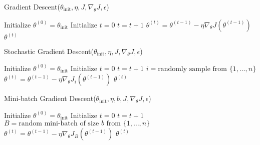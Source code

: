 \documentclass{article}
\begin{document}
\begin{algorithm*}
\caption{Gradient Descent($\theta_{\text{init}}, \eta, J, \nabla_\theta J, \epsilon$)}
\label{alg:gradient-descent}
\begin{algorithmic}[1]
\STATE Initialize $\theta^{(0)} = \theta_{\text{init}}$
\STATE Initialize $t = 0$
\REPEAT
  \STATE $t = t + 1$
  \STATE $\theta^{(t)} = \theta^{(t-1)} - \eta \nabla_\theta J(\theta^{(t-1)})$
\RETURN $\theta^{(t)}$
\end{algorithmic}
\end{algorithm*}

\clearpage

\begin{algorithm*}
\caption{Stochastic Gradient Descent($\theta_{\text{init}}, \eta, J, \nabla_\theta J, \epsilon$)}
\label{alg:stochastic-gradient-descent}
\begin{algorithmic}[1]
\STATE Initialize $\theta^{(0)} = \theta_{\text{init}}$
\STATE Initialize $t = 0$
\REPEAT
  \STATE $t = t + 1$
  \STATE $i = \text{randomly sample from } \{1, \ldots, n\}$
  \STATE $\theta^{(t)} = \theta^{(t-1)} - \eta \nabla_\theta J_i(\theta^{(t-1)})$
\RETURN $\theta^{(t)}$
\end{algorithmic}
\end{algorithm*}

\clearpage

\begin{algorithm*}
\caption{Mini-batch Gradient Descent($\theta_{\text{init}}, \eta, b, J, \nabla_\theta J, \epsilon$)}
\label{alg:mini-batch-gradient-descent}
\begin{algorithmic}[1]
\STATE Initialize $\theta^{(0)} = \theta_{\text{init}}$
\STATE Initialize $t = 0$
\REPEAT
  \STATE $t = t + 1$
  \STATE $B = \text{random mini-batch of size } b \text{ from } \{1, \ldots, n\}$
  \STATE $\theta^{(t)} = \theta^{(t-1)} - \eta \nabla_\theta J_B(\theta^{(t-1)})$
\RETURN $\theta^{(t)}$
\end{algorithmic}
\end{algorithm*}
\end{document}
